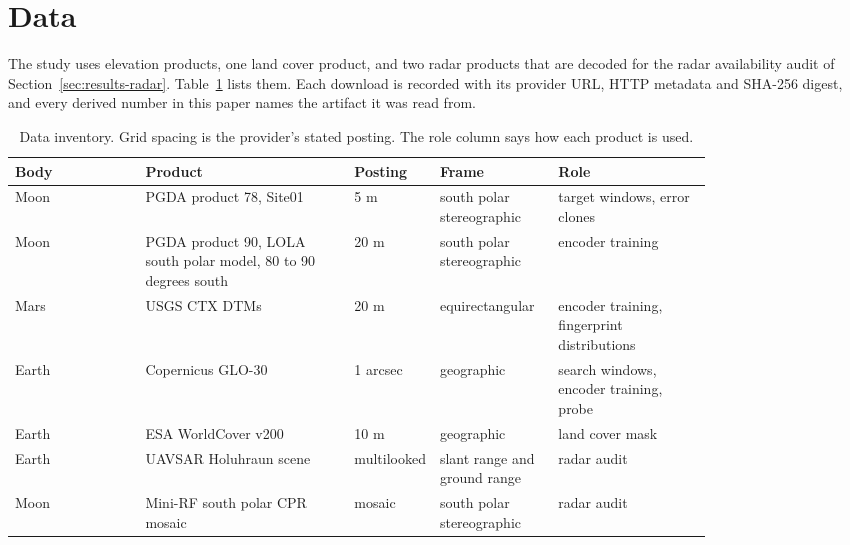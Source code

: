 \section{Data}
\label{sec:data}

The study uses elevation products, one land cover product, and two radar products that are decoded for the radar availability audit of Section~\ref{sec:results-radar}. Table~\ref{tab:data} lists them. Each
download is recorded with its provider URL, HTTP metadata and SHA-256 digest, and every derived
number in this paper names the artifact it was read from.

\begin{table}[tbp]
\centering
\caption{Data inventory. Grid spacing is the provider's stated posting. The role column says how
each product is used.}
\label{tab:data}
\footnotesize
\begin{tabular}{@{}lp{0.30\linewidth}p{0.12\linewidth}p{0.17\linewidth}p{0.22\linewidth}@{}}
\toprule
Body & Product & Posting & Frame & Role \\
\midrule
Moon & PGDA product 78, Site01 \citep{barker2021} & 5 m & south polar stereographic & target windows, error clones \\
Moon & PGDA product 90, LOLA south polar model, 80 to 90 degrees south & 20 m & south polar stereographic & encoder training \\
Mars & USGS CTX DTMs \citep{laura2021} & 20 m & equirectangular & encoder training, fingerprint distributions \\
Earth & Copernicus GLO-30 \citep{airbus2022copernicus} & 1 arcsec & geographic & search windows, encoder training, probe \\
Earth & ESA WorldCover v200 \citep{zanaga2022} & 10 m & geographic & land cover mask \\
Earth & UAVSAR Holuhraun scene \citep{rosen2006} & multilooked & slant range and ground range & radar audit \\
Moon & Mini-RF south polar CPR mosaic \citep{nozette2010} & mosaic & south polar stereographic & radar audit \\
\bottomrule
\end{tabular}
\end{table}

